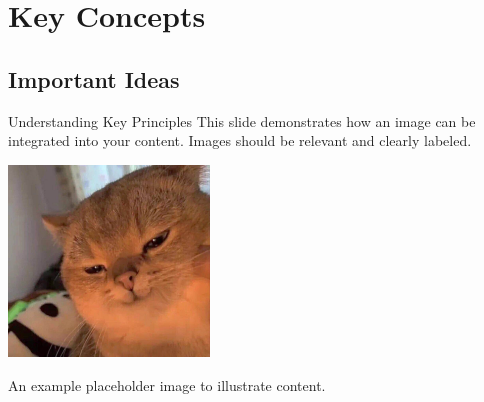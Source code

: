 \section{Key Concepts}
\subsection{Important Ideas}
\begin{frame}{Understanding Key Principles}
	This slide demonstrates how an image can be integrated into your content. Images should be relevant and clearly labeled.

	\vspace{0.5cm}
	\centering
	\includegraphics[width=0.4\textwidth]{figures/example.png}
	\par\small An example placeholder image to illustrate content.
\end{frame}
